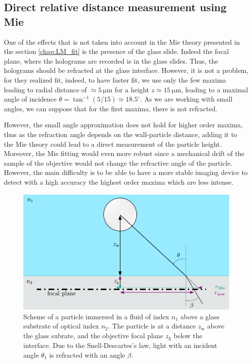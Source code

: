 \subsection{Direct relative distance measurement using Mie}

One of the effects that is not taken into account in the Mie theory presented in the section \ref{chap:LM_fit} is the presence of the glass slide. Indeed the focal plane, where the holograms are recorded is in the glass slides. Thus, the holograms should be refracted at the glass interface. However, it is not a problem, for they realized fit, indeed, to have faster fit, we use only the few maxima leading to radial distance of $\simeq 5 ~\mathrm{\mu m }$ for a height $z\simeq 15~\mathrm{\mu m}$, leading to a maximal angle of incidence $\theta = \tan^{-1} (5/15) \simeq 18.5 ^{\circ} $. As we are working with small angles, we can suppose that for the first maxima, there is not refracted. 

However, the small angle approximation does not hold for higher order maxima, thus as the refraction angle depends on the wall-particle distance, adding it to the Mie theory could lead to a direct measurement of the particle height. Moreover, the Mie fitting would even more robust since a mechanical drift of the sample of the objective would not change the refractive angle of the particle. However, the main difficulty is to be able to have a more stable imaging device to detect with a high accuracy the highest order maxima which are less intense.


\begin{figure}[H]
	\centering
	\includegraphics{02_body/chapter4/images/h_measurement/drawing_angles.pdf}
	\caption{Scheme of a particle immersed in a fluid of index $n_1$ above a glass substrate of optical index $n_2$. The particle is at a distance $z_\mathrm{w}$ above the glass subrate, and the objective focal plane $z_\mathrm{g}$ below the interface. Due to the Snell-Descartes’s law, light with an incident angle $\theta_1$ is refracted with an angle $\beta$. }
	\label{fig.schema_h}
\end{figure}

